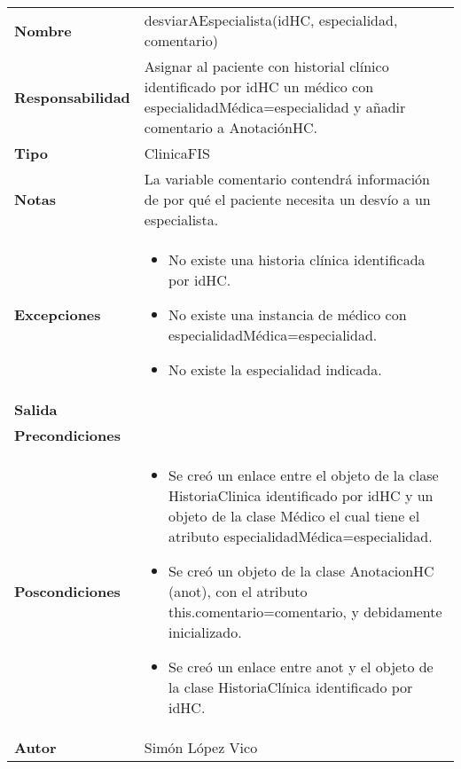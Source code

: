 \documentclass[11pt,a4paper]{article}
\newenvironment{itemizenomargins}
    {\begin{minipage}[t]{1\linewidth}\begin{itemize}}
    {\end{itemize}\end{minipage}}
\begin{document}
\begin{table}[H]
	\centering
	\label{my-label}
	\begin{tabularx}{\textwidth}{l|X}
		\textbf{Nombre}          & desviarAEspecialista(idHC, especialidad, comentario)\\
		\textbf{Responsabilidad} & Asignar al paciente con historial clínico identificado por idHC un médico con especialidadMédica=especialidad y añadir comentario a AnotaciónHC.\\
		\textbf{Tipo}            & ClinicaFIS \\
		\textbf{Notas}           & La variable comentario contendrá información de por qué el paciente necesita un desvío a un especialista. \\
		\textbf{Excepciones}     &
		\begin{itemizenomargins}
			\item No existe una historia clínica identificada por idHC.
			\item No existe una instancia de médico con especialidadMédica=especialidad.
			\item No existe la especialidad indicada.
		\end{itemizenomargins} \\
		\textbf{Salida}          &  \\
		\textbf{Precondiciones}  &  \\
		\textbf{Poscondiciones}  &
		\begin{itemizenomargins}
			\item Se creó un enlace entre el objeto de la clase HistoriaClinica identificado por idHC y un objeto de la clase Médico el cual tiene el atributo especialidadMédica=especialidad.
			\item Se creó un objeto de la clase AnotacionHC (anot), con el atributo this.comentario=comentario, y debidamente inicializado.
			\item Se creó un enlace entre anot y el objeto de la clase HistoriaClínica identificado por idHC.
		\end{itemizenomargins} \\
		\textbf{Autor}			 & Simón López Vico
	\end{tabularx}
\end{table}
\end{document}
